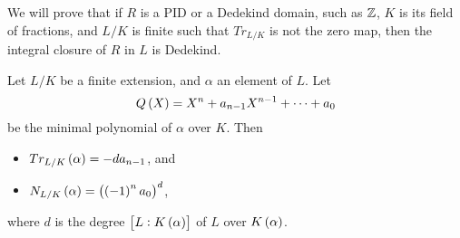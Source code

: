 We will prove that if $ R $ is a PID or a Dedekind domain, such as $ \mathbb{Z} $, $ K $ is its field of fractions, and $ L / K $ is finite such that $ Tr_{L / K} $ is not the zero map, then the integral closure of $ R $ in $ L $ is Dedekind.

\pagebreak


\begin{proposition}
\label{prop:12.2.2}
Let $ L / K $ be a finite extension, and $ \alpha $ an element of $ L $. Let
$$ Q\br{X} = X^n + a_{n - 1}X^{n - 1} + \dots + a_0 $$
be the minimal polynomial of $ \alpha $ over $ K $. Then
\begin{itemize}
\item $ Tr_{L / K}\br{\alpha} = -da_{n - 1} $, and
\item $ N_{L / K}\br{\alpha} = \br{\br{-1}^na_0}^d $,
\end{itemize}
where $ d $ is the degree $ \sbr{L : K\br{\alpha}} $ of $ L $ over $ K\br{\alpha} $.
\end{proposition}

